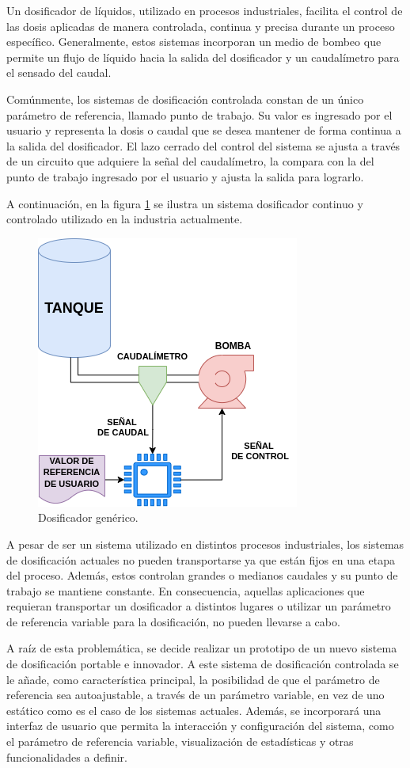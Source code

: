 \documentclass[
11pt, %
]{charter}
\begin{document}
Un dosificador de líquidos, utilizado en procesos industriales, facilita el control de las dosis aplicadas de manera controlada, continua y precisa durante un proceso específico. Generalmente, estos sistemas incorporan un medio de bombeo que permite un flujo de líquido hacia la salida del dosificador y un caudalímetro para el sensado del caudal.

Comúnmente, los sistemas de dosificación controlada constan de un único parámetro de referencia, llamado punto de trabajo. Su valor es ingresado por el usuario y representa la dosis o caudal que se desea mantener de forma continua a la salida del dosificador. El lazo cerrado del control del sistema se ajusta a través de un circuito que adquiere la señal del caudalímetro, la compara con la del punto de trabajo ingresado por el usuario y ajusta la salida para lograrlo.

A continuación, en la figura \ref{fig:diagCaudalimetroGenerico} se ilustra un sistema dosificador continuo y controlado utilizado en la industria actualmente.

\vspace{25px}
\begin{figure}[htpb]
\centering 
\includegraphics[width=.45\textwidth]{./Figuras/diagCaudalimetroGenerico.png}
\caption{Dosificador genérico.}
\label{fig:diagCaudalimetroGenerico}
\end{figure}


A pesar de ser un sistema utilizado en distintos procesos industriales, los sistemas de dosificación actuales no pueden transportarse ya que están fijos en una etapa del proceso. Además, estos controlan grandes o medianos caudales y su punto de trabajo se mantiene constante. En consecuencia, aquellas aplicaciones que requieran transportar un dosificador a distintos lugares o utilizar un parámetro de referencia variable para la dosificación, no pueden llevarse a cabo.

A raíz de esta problemática, se decide realizar un prototipo de un nuevo sistema de dosificación portable e innovador. A este sistema de dosificación controlada se le añade, como característica principal, la posibilidad de que el parámetro de referencia sea autoajustable, a través de un parámetro variable, en vez de uno estático como es el caso de los sistemas actuales. Además, se incorporará una interfaz de usuario que permita la interacción y configuración del sistema, como el parámetro de referencia variable, visualización de estadísticas y otras funcionalidades a definir. 
\end{document}
